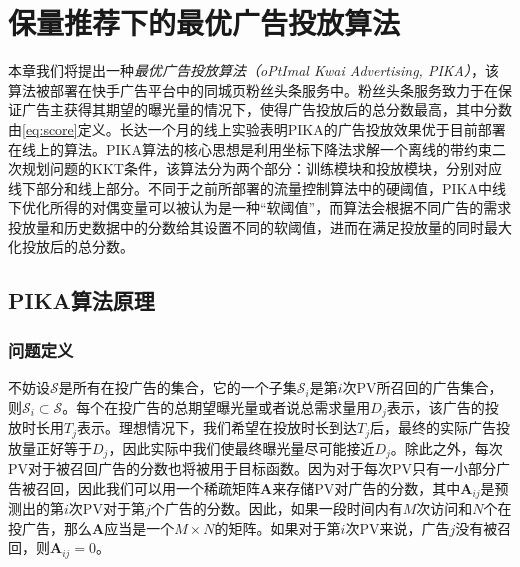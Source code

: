 \chapter{保量推荐下的最优广告投放算法}
\label{cha:allocation}

本章我们将提出一种\textit{最优广告投放算法（oPtImal Kwai Advertising, PIKA）}，该算法被部署在快手广告平台中的同城页粉丝头条服务中。粉丝头条服务致力于在保证广告主获得其期望的曝光量的情况下，使得广告投放后的总分数最高，其中分数由\eqref{eq:score}定义。长达一个月的线上实验表明PIKA的广告投放效果优于目前部署在线上的算法。PIKA算法的核心思想是利用坐标下降法求解一个离线的带约束二次规划问题的KKT条件，该算法分为两个部分：训练模块和投放模块，分别对应线下部分和线上部分。不同于之前所部署的流量控制算法中的硬阈值，PIKA中线下优化所得的对偶变量可以被认为是一种“软阈值”，而算法会根据不同广告的需求投放量和历史数据中的分数给其设置不同的软阈值，进而在满足投放量的同时最大化投放后的总分数。

\section{PIKA算法原理}

\subsection{问题定义}

不妨设$\mathcal{S}$是所有在投广告的集合，它的一个子集$\mathcal{S}_i$是第$i$次PV所召回的广告集合，则$\mathcal{S}_i \subset \mathcal{S}$。每个在投广告的总期望曝光量或者说总需求量用$D_j$表示，该广告的投放时长用$T_j$表示。理想情况下，我们希望在投放时长到达$T_j$后，最终的实际广告投放量正好等于$D_j$，因此实际中我们使最终曝光量尽可能接近$D_j$。除此之外，每次PV对于被召回广告的分数也将被用于目标函数。因为对于每次PV只有一小部分广告被召回，因此我们可以用一个稀疏矩阵$\bm{A}$来存储PV对广告的分数，其中$\bm{A}_{ij}$是预测出的第$i$次PV对于第$j$个广告的分数。因此，如果一段时间内有$M$次访问和$N$个在投广告，那么$\bm{A}$应当是一个$M \times N$的矩阵。如果对于第$i$次PV来说，广告$j$没有被召回，则$\bm{A}_{ij}=0$。

